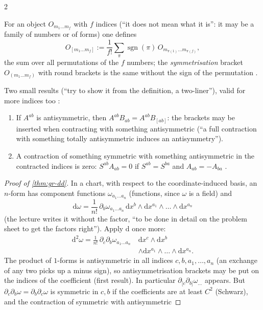 \begin{paracol}{2}
\begin{definition}\label{def:gr-brackets}
For an object $O_{m_1\dots m_f}$ with $f$ indices (``it does not mean what it is'': it may be a family of numbers or of forms) one defines
\[
  O_{[m_1\dots m_f]}:=\frac1{f!}\sum_\pi\operatorname{sgn}(\pi)\,O_{m_{\pi(1)}\dots m_{\pi(f)}},
\]
the sum over all permutations of the $f$ numbers; the \emph{symmetrisation} bracket $O_{(m_1\dots m_f)}$ with round brackets is the same without the sign of the permutation     .
\end{definition}
Two small results (``try to show it from the definition, a two-liner''), valid for more indices too  :
\begin{enumerate}
  \item If $A^{ab}$ is antisymmetric, then $A^{ab}B_{ab}=A^{ab}B_{[ab]}$: the brackets may be inserted when contracting with something antisymmetric (``a full contraction with something totally antisymmetric induces an antisymmetry'').
  \item A contraction of something symmetric with something antisymmetric in the contracted indices is zero: $S^{ab}A_{ab}=0$ if $S^{ab}=S^{ba}$ and $A_{ab}=-A_{ba}$      .
\end{enumerate}
\begin{proof}[Proof of \cref{thm:gr-dd}]
In a chart, with respect to the coordinate-induced basis, an $n$-form has component functions $\omega_{a_1\dots a_n}$ (functions, since $\omega$ is a field) and
\[
  \mathrm d\omega=\frac1{n!}\,\partial_b\omega_{a_1\dots a_n}\,\mathrm dx^b\wedge\mathrm dx^{a_1}\wedge\dots\wedge\mathrm dx^{a_n}
\]
(the lecture writes it without the factor, ``to be done in detail on the problem sheet to get the factors right''). Apply $\mathrm d$ once more:
\[
  \begin{aligned}
  \mathrm d^2\omega=\frac1{n!}\,\partial_c\partial_b\omega_{a_1\dots a_n}\ &\mathrm dx^c\wedge\mathrm dx^b\\
  &\wedge\mathrm dx^{a_1}\wedge\dots\wedge\mathrm dx^{a_n}.
  \end{aligned}
\]
The product of $1$-forms is antisymmetric in all indices $c,b,a_1,\dots,a_n$ (an exchange of any two picks up a minus sign), so antisymmetrisation brackets may be put on the indices of the coefficient (first result). In particular $\partial_{[c}\partial_{b]}\omega_{\dots}$ appears. But $\partial_c\partial_b\omega=\partial_b\partial_c\omega$ is symmetric in $c,b$ if the coefficients are at least $C^2$ (Schwarz), and the contraction of symmetric with antisymmetric

\end{proof}
\end{paracol}
